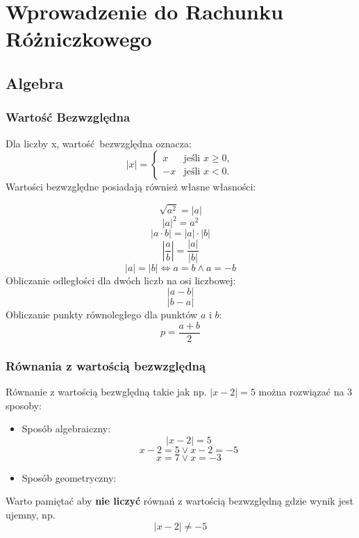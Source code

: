 \documentclass[12pt, a4paper]{article}
\begin{document}
\tableofcontents

\newpage
\section{Wprowadzenie do Rachunku Różniczkowego}
\subsection{Algebra}


\subsubsection{Wartość Bezwzględna}
Dla liczby x, wartość bezwzględna oznacza:
$$
|x| =
\begin{cases}
  x & \text{jeśli } x \geq 0, \\
  -x & \text{jeśli } x < 0.
\end{cases}
$$
Wartości bezwzględne posiadają również własne własności:

$$\sqrt{a^2} = \left|a\right|$$
$$\left|a\right|^2 = a^2$$
$$\left|a \cdot b\right| = \left| a \right| \cdot \left| b \right|$$
$$\left|\frac{a}{b}\right| = \frac{\left|a\right|}{\left|b\right|}$$
$$\left|a\right|=\left|b\right| \Longleftrightarrow a=b \wedge a = -b$$
Obliczanie odległości dla dwóch liczb na osi liczbowej:
$$\left|a-b\right|$$
$$\left|b-a\right|$$
Obliczanie punkty równoległego dla punktów $a$ i $b$:
$$p = \frac{a+b}{2}$$


\subsubsection*{Równania z wartością bezwzględną}
Równanie z wartością bezwględną takie jak np. $\left|x-2\right|=5$ można rozwiązać na 3 sposoby:
\begin{itemize}
  \item Sposób algebraiczny:
      $$\left|x-2\right|=5$$
      $$x-2=5 \vee x-2=-5$$
      $$x=7\vee x=-3$$
    \item Sposób geometryczny:
    \begin{center}
    \end{center}
\end{itemize}
Warto pamiętać aby \textbf{nie liczyć} równań z wartością bezwzględną gdzie wynik jest ujemny, np.
$$\left|x-2\right|\neq-5$$
\end{document}
